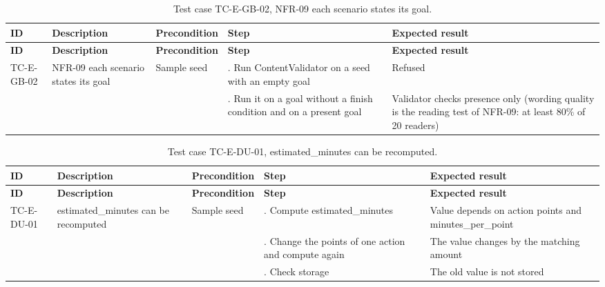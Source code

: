 {\small
\begin{longtable}{|>{\raggedright\arraybackslash}p{}|>{\raggedright\arraybackslash}p{}|>{\raggedright\arraybackslash}p{}|>{\raggedright\arraybackslash}p{}|>{\raggedright\arraybackslash}p{}|}
\caption{Test case TC-E-GB-02, NFR-09 each scenario states its goal.} \\
\hline
\textbf{ID} & \textbf{Description} & \textbf{Precondition} & \textbf{Step} & \textbf{Expected result} \\ \hline
\endfirsthead
\hline
\textbf{ID} & \textbf{Description} & \textbf{Precondition} & \textbf{Step} & \textbf{Expected result} \\ \hline
\endhead
TC-E-GB-02 & NFR-09 each scenario states its goal & Sample seed & 1. Run ContentValidator on a seed with an empty goal & Refused \\ \hline
 &  &  & 2. Run it on a goal without a finish condition and on a present goal & Validator checks presence only (wording quality is the reading test of NFR-09: at least 80\% of 20 readers) \\ \hline
\end{longtable}
}

{\small
\begin{longtable}{|>{\raggedright\arraybackslash}p{}|>{\raggedright\arraybackslash}p{}|>{\raggedright\arraybackslash}p{}|>{\raggedright\arraybackslash}p{}|>{\raggedright\arraybackslash}p{}|}
\caption{Test case TC-E-DU-01, estimated\_minutes can be recomputed.} \\
\hline
\textbf{ID} & \textbf{Description} & \textbf{Precondition} & \textbf{Step} & \textbf{Expected result} \\ \hline
\endfirsthead
\hline
\textbf{ID} & \textbf{Description} & \textbf{Precondition} & \textbf{Step} & \textbf{Expected result} \\ \hline
\endhead
TC-E-DU-01 & estimated\_minutes can be recomputed & Sample seed & 1. Compute estimated\_minutes & Value depends on action points and minutes\_per\_point \\ \hline
 &  &  & 2. Change the points of one action and compute again & The value changes by the matching amount \\ \hline
 &  &  & 3. Check storage & The old value is not stored \\ \hline
\end{longtable}
}


